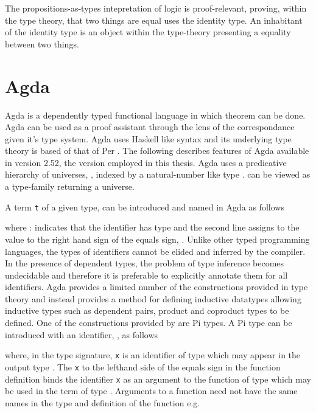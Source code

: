 The propositions-as-types intepretation of logic is
proof-relevant, proving, within the type theory, that two things are equal uses
the identity type. An inhabitant of the identity type is an object within the
type-theory presenting a equality between two things.


\section{Agda}

Agda is a dependently typed functional language in which theorem can be done.
Agda can be used as a proof assistant through the lens of the \cuho{}
correspondance given it's type system. Agda uses Haskell like syntax and its
underlying type theory is based of that of Per \mlt. The following
describes features of Agda available in version 2.52, the version employed in
this thesis. Agda uses a predicative hierarchy of universes,
, indexed by a natural-number like type
.  can be viewed as a type-family
returning a universe.

A term \verb|t| of a given type,  can be introduced and named
in Agda as follows



where  :  indicates that the identifier
 has type  and the second line assigns to
 the value to the right hand sign of the equals sign,
. Unlike other typed programming languages, the types of
identifiers cannot be elided and inferred by the compiler. In the presence of
dependent types, the problem of type inference becomes undecidable and therefore
it is preferable to explicitly annotate them for all identifiers. Agda provides
a limited number of the constructions provided in \mlt{} type theory and
instead provides a method for defining inductive datatypes allowing inductive
types such as dependent pairs, product and coproduct types to be defined. One of
the constructions provided by are Pi types. A Pi type can be introduced with an
identifier, , as follows


where, in the type signature, \verb|x| is an identifier of type 
which may appear in the output type . The \verb|x| to the
lefthand side of the equals sign in the function definition binds the identifier
\verb|x| as an argument to the function of type  which may be
used in the term  of type . Arguments to a
function need not have the same names in the type and definition of the function
e.g.

